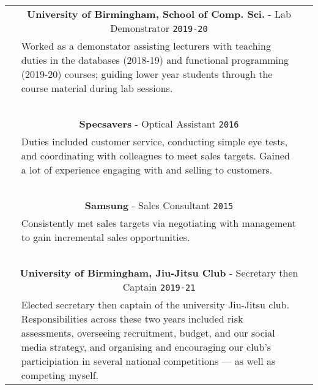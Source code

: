 \documentclass[letterpaper,11pt]{article}
\begin{document}
\centering

\def\arraystretch{1.2}

\begin{tabular*}{6.6in}{p{0.1in}p{6.4in}p{0.1in}}

  \multicolumn{3}{c}{\textbf{University of Birmingham, School of Comp. Sci.} - Lab Demonstrator   \cftdotfill{\cftdotsep} \texttt{2019-20}}\\
  \, & {\small Worked as a demonstator assisting lecturers with teaching duties in the databases (2018-19) and functional programming (2019-20) courses; guiding lower year students through the course material during lab sessions. } & \, \\
  \, & \, & \, \\
  
  \multicolumn{3}{c}{\textbf{Specsavers} - Optical Assistant \cftdotfill{\cftdotsep} \texttt{2016}}\\
  \, & {\small Duties included customer service, conducting simple eye tests, and coordinating with colleagues to meet sales targets. Gained a lot of experience engaging with and selling to customers.} & \, \\
  \, & \, & \, \\

  \multicolumn{3}{c}{\textbf{Samsung} - Sales Consultant \cftdotfill{\cftdotsep} \texttt{2015}}\\
  \, & {\small Consistently met sales targets via negotiating with management to gain incremental sales opportunities. } & \, \\
  \, & \, & \, \\

  \multicolumn{3}{c}{\textbf{University of Birmingham,  Jiu-Jitsu Club} - Secretary then Captain \cftdotfill{\cftdotsep} \texttt{2019-21}}\\
  \, & {\small Elected secretary then captain of the university Jiu-Jitsu club. Responsibilities across these two years included risk assessments, overseeing recruitment, budget, and our social media strategy, and organising and encouraging our club's participiation in several national competitions --- as well as competing myself. } & \,


\end{tabular*}                                                                                                                                                                                                                                                                                          
\end{document}
